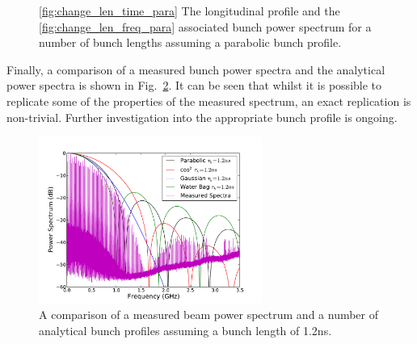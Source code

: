 \documentclass[12pt,a4paper,twopage,openright]{report}
\begin{document}
\begin{figure}
\caption{\ref{fig:change_len_time_para} The longitudinal profile and the \ref{fig:change_len_freq_para} associated bunch power spectrum for a number of bunch lengths assuming a parabolic bunch profile.}
\label{fig:diff_bunch_len_para}
\end{figure}

Finally, a comparison of a measured bunch power spectra and the analytical power spectra is shown in Fig.~\ref{fig:power_all}. It can be seen that whilst it is possible to replicate some of the properties of the measured spectrum, an exact replication is non-trivial. Further investigation into the appropriate bunch profile is ongoing.

\begin{figure}
\begin{center}
\includegraphics[width=0.65\textwidth]{figures/beam_spectra_power_12ns.pdf}
\end{center}
\label{fig:power_all}
\caption{A comparison of a measured beam power spectrum and a number of analytical bunch profiles assuming a bunch length of 1.2ns.}
\end{figure}
\end{document}

